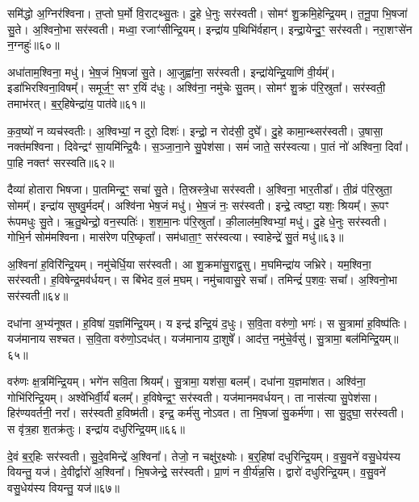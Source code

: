 समि॑द्धो अ॒ग्निर॑श्विना।
त॒प्तो घ॒र्मो वि॒राट्थ्सु॒तः।
दु॒हे धे॒नुः सर॑स्वती।
सोमꣳ॑ शु॒क्रमि॒हेन्द्रि॒यम्।
त॒नू॒पा भि॒षजा॑ सु॒ते।
अ॒श्विनो॒भा सर॑स्वती।
मध्वा॒ रजाꣳ॑सीन्द्रि॒यम्।
इन्द्रा॑य प॒थिभि॑र्वहान्।
इन्द्रा॒येन्दु॒ꣳ॒ सर॑स्वती।
नरा॒शꣳसे॑न न॒ग्नहुः॑॥६०॥

अधा॑ताम॒श्विना॒ मधु॑।
भे॒ष॒जं भि॒षजा॑ सु॒ते।
आ॒जुह्वा॑ना॒ सर॑स्वती।
इन्द्रा॑येन्द्रि॒याणि॑ वी॒र्यम्᳚।
इडा॑भिरश्विना॒विषम्᳚।
समूर्ज॒ꣳ॒ सꣳ र॒यिं द॑धुः।
अश्वि॑ना॒ नमु॑चेः सु॒तम्।
सोमꣳ॑ शु॒क्रं प॑रि॒स्रुता᳚।
सर॑स्वती॒ तमाभ॑रत्।
ब॒र्॒हिषेन्द्रा॑य॒ पात॑वे॥६१॥

क॒व॒ष्यो॑ न व्यच॑स्वतीः।
अ॒श्विभ्यां॒ न दुरो॒ दिशः॑।
इन्द्रो॒ न रोद॑सी॒ दुघे᳚।
दु॒हे कामा॒न्थ्सर॑स्वती।
उ॒षासा॒ नक्त॑मश्विना।
दिवेन्द्रꣳ॑ सा॒यमि॑न्द्रि॒यैः।
स॒ञ्जा॒ना॒ने सु॒पेश॑सा।
समं॑ जाते॒ सर॑स्वत्या।
पा॒तं नो॑ अश्विना॒ दिवा᳚।
पा॒हि नक्तꣳ॑ सरस्वति॥६२॥

दैव्या॑ होतारा भिषजा।
पा॒तमिन्द्र॒ꣳ॒ सचा॑ सु॒ते।
ति॒स्रस्त्रे॒धा सर॑स्वती।
अ॒श्विना॒ भार॒तीडा᳚।
ती॒व्रं प॑रि॒स्रुता॒ सोमम्᳚।
इन्द्रा॑य सुषवु॒र्मदम्᳚।
अश्वि॑ना भेष॒जं मधु॑।
भे॒ष॒जं नः॒ सर॑स्वती।
इन्द्रे॒ त्वष्टा॒ यशः॒ श्रियम्᳚।
रू॒पꣳ रू॑पमधुः सु॒ते।
ऋ॒तु॒थेन्द्रो॒ वन॒स्पतिः॑।
श॒श॒मा॒नः प॑रि॒स्रुता᳚।
की॒लाल॑म॒श्विभ्यां॒ मधु॑।
दु॒हे धे॒नुः सर॑स्वती।
गोभि॒र्न सोम॑मश्विना।
मास॑रेण परि॒ष्कृता᳚।
सम॑धाता॒ꣳ॒ सर॑स्वत्या।
स्वाहेन्द्रे॑ सु॒तं मधु॑॥६३॥\anuvakamend[न॒ग्नहुः॒ पात॑वे सरस्वत्यधुः सु॒ते᳚\-ऽष्टौ च॑]

अ॒श्विना॑ ह॒विरि॑न्द्रि॒यम्।
नमु॑चेर्धि॒या सर॑स्वती।
आ शु॒क्रमा॑सु॒राद्व॒सु।
म॒घमिन्द्रा॑य जभ्रिरे।
यम॒श्विना॒ सर॑स्वती।
ह॒विषेन्द्र॒मव॑र्धयन्।
स बि॑भेद व॒लं म॒घम्।
नमु॑चावासु॒रे सचा᳚।
तमिन्द्रं॑ प॒शवः॒ सचा᳚।
अ॒श्विनो॒भा सर॑स्वती॥६४॥

दधा॑ना अ॒भ्य॑नूषत।
ह॒विषा॑ य॒ज्ञमि॑न्द्रि॒यम्।
य इन्द्र॑ इन्द्रि॒यं द॒धुः।
स॒वि॒ता वरु॑णो॒ भगः॑।
स सु॒त्रामा॑ ह॒विष्प॑तिः।
यज॑मानाय सश्चत।
स॒वि॒ता वरु॑णो॒\-ऽदध॑त्।
यज॑मानाय दा॒शुषे᳚।
आद॑त्त॒ नमु॑चे॒र्वसु॑।
सु॒त्रामा॒ बल॑मिन्द्रि॒यम्॥६५॥

वरु॑णः क्ष॒त्रमि॑न्द्रि॒यम्।
भगे॑न सवि॒ता श्रियम्᳚।
सु॒त्रामा॒ यश॑सा॒ बलम्᳚।
दधा॑ना य॒ज्ञमा॑शत।
अश्वि॑ना॒ गोभि॑रिन्द्रि॒यम्।
अश्वे॑भिर्वी॒र्यं॑ बलम्᳚।
ह॒विषेन्द्र॒ꣳ॒ सर॑स्वती।
यज॑मानमवर्धयन्।
ता नास॑त्या सु॒पेश॑सा।
हिर॑ण्यवर्तनी॒ नरा᳚।
सर॑स्वती ह॒विष्म॑ती।
इन्द्र॒ कर्म॑सु नोऽवत।
ता भि॒षजा॑ सु॒कर्म॑णा।
सा सु॒दुघा॒ सर॑स्वती।
स वृ॑त्र॒हा श॒तक्र॑तुः।
इन्द्रा॑य दधुरिन्द्रि॒यम्॥६६॥\anuvakamend[उ॒भा सर॑स्वती॒ बल॑मिन्द्रि॒यन्नरा॒ षट्च॑]

दे॒वं ब॒र्॒हिः सर॑स्वती।
सु॒दे॒वमिन्द्रे॑ अ॒श्विना᳚।
तेजो॒ न चक्षु॑र॒क्ष्योः।
ब॒र्॒हिषा॑ दधुरिन्द्रि॒यम्।
व॒सु॒वने॑ वसु॒धेय॑स्य वियन्तु॒ यज॑।
दे॒वीर्द्वारो॑ अ॒श्विना᳚।
भि॒षजेन्द्रे॒ सर॑स्वती।
प्रा॒णं न वी॒र्य॑न्न॒सि।
द्वारो॑ दधुरिन्द्रि॒यम्।
व॒सु॒वने॑ वसु॒धेय॑स्य वियन्तु॒ यज॑॥६७॥

